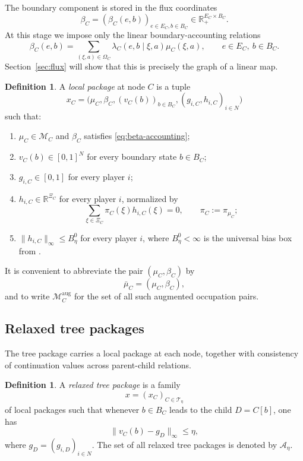 \documentclass[12pt]{article}
\theoremstyle{definition}
\newtheorem{definition}[theorem]{Definition}
\newcommand{\R}{\mathbb{R}}
\newcommand{\1}{\mathbf{1}}
\newcommand{\cA}{\mathcal{A}}
\newcommand{\cM}{\mathcal{M}}
\newcommand{\cT}{\mathcal{T}}
\begin{document}
The boundary component is stored in the flux coordinates
\[
\beta_C=(\beta_C(e,b))_{e\in E_C,b\in B_C}\in \R_+^{E_C\times B_C}.
\]
At this stage we impose only the linear boundary-accounting relations
\begin{equation}
\label{eq:beta-accounting}
\beta_C(e,b)
=
\sum_{(\xi,a)\in \Omega_C}\lambda_C(e,b\mid \xi,a)\mu_C(\xi,a),
\qquad e\in E_C,\ b\in B_C.
\end{equation}
Section~\ref{sec:flux} will show that this is precisely the graph of a linear map.

\begin{definition}
A \emph{local package} at node \(C\) is a tuple
\[
x_C=\bigl(\mu_C,\beta_C,(v_C(b))_{b\in B_C},(g_{i,C},h_{i,C})_{i\in N}\bigr)
\]
such that:
\begin{enumerate}[label=\textnormal{(L\arabic*)},leftmargin=2.6em]
\item \(\mu_C\in \cM_C\) and \(\beta_C\) satisfies \eqref{eq:beta-accounting};
\item \(v_C(b)\in[0,1]^N\) for every boundary state \(b\in B_C\);
\item \(g_{i,C}\in[0,1]\) for every player \(i\);
\item \(h_{i,C}\in \R^{\Xi_C}\) for every player \(i\), normalized by
\[
\sum_{\xi\in \Xi_C}\pi_C(\xi)h_{i,C}(\xi)=0,
\qquad \pi_C:=\pi_{\mu_C};
\]
\item \(\|h_{i,C}\|_\infty\le B_\eta^0\) for every player \(i\), where \(B_\eta^0<\infty\)
is the universal bias box from .
\end{enumerate}
\end{definition}

It is convenient to abbreviate the pair \((\mu_C,\beta_C)\) by
\[
\bar\mu_C=(\mu_C,\beta_C),
\]
and to write \(\cM_C^{\mathrm{aug}}\) for the set of all such augmented occupation pairs.

\subsection{Relaxed tree packages}

The tree package carries a local package at each node, together with consistency of
continuation values across parent-child relations.

\begin{definition}
A \emph{relaxed tree package} is a family
\[
x=(x_C)_{C\in \cT_\eta}
\]
of local packages such that whenever \(b\in B_C\) leads to the child \(D=C[b]\), one has
\begin{equation}
\label{eq:child-consistency}
\|v_C(b)-g_D\|_\infty\le \eta,
\end{equation}
where \(g_D=(g_{i,D})_{i\in N}\).  The set of all relaxed tree packages is denoted by
\(\cA_\eta\).
\end{definition}
\end{document}
